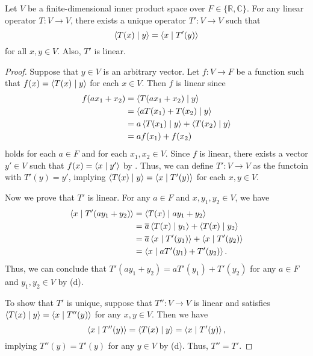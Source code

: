 \begin{theorem}
  Let $V$ be a finite-dimensional inner product space over
  $F \in \{\mathbb{R}, \mathbb{C}\}$.
  For any linear operator $T: V \to V$, there exists a unique operator
  $T': V \to V$ such that
  \begin{equation*}
    \left\langle T(x) \; \middle| \; y \right\rangle = \left\langle x \; \middle| \; T'(y) \right\rangle
  \end{equation*}
  for all $x, y \in V$.
  Also, $T'$ is linear.
\end{theorem}
\begin{proof}
  Suppose that $y \in V$ is an arbitrary vector.
  Let $f: V \to F$ be a function such that $f(x) = \left\langle T(x) \; \middle| \; y \right\rangle$ for each
  $x \in V$.
  Then $f$ is linear since
  \begin{align*}
    f(ax_1 + x_2)
    &= \left\langle T(ax_1 + x_2) \; \middle| \; y \right\rangle \\
    &= \left\langle aT(x_1) + T(x_2) \; \middle| \; y \right\rangle \\
    &= a\left\langle T(x_1) \; \middle| \; y \right\rangle + \left\langle T(x_2) \; \middle| \; y \right\rangle \\
    &= af(x_1) + f(x_2)
  \end{align*}
  holds for each $a \in F$ and for each $x_1, x_2 \in V$.
  Since $f$ is linear, there exists a vector $y' \in V$ such that
  $f(x) = \left\langle x \; \middle| \; y' \right\rangle$ by .
  Thus, we can define $T': V \to V$ as the functoin with $T'(y) = y'$,
  implying $\left\langle T(x) \; \middle| \; y \right\rangle = \left\langle x \; \middle| \; T'(y) \right\rangle$ for each $x, y \in V$.

  Now we prove that $T'$ is linear.
  For any $a \in F$ and $x, y_1, y_2 \in V$, we have
  \begin{align*}
    \left\langle x \; \middle| \; T'(ay_1 + y_2) \right\rangle
    &= \left\langle T(x) \; \middle| \; ay_1 + y_2 \right\rangle \\
    &= \overline{a}\left\langle T(x) \; \middle| \; y_1 \right\rangle + \left\langle T(x) \; \middle| \; y_2 \right\rangle \\
    &= \overline{a}\left\langle x \; \middle| \; T'(y_1) \right\rangle + \left\langle x \; \middle| \; T'(y_2) \right\rangle \\
    &= \left\langle x \; \middle| \; aT'(y_1) + T'(y_2) \right\rangle.
  \end{align*}
  Thus, we can conclude that $T'(ay_1 + y_2) = aT'(y_1) + T'(y_2)$ for any
  $a \in F$ and $y_1, y_2 \in V$ by  (d).

  To show that $T'$ is unique, suppose that $T'': V \to V$ is linear and
  satisfies $\left\langle T(x) \; \middle| \; y \right\rangle = \left\langle x \; \middle| \; T''(y) \right\rangle$ for any $x, y \in V$.
  Then we have
  \begin{equation*}
    \left\langle x \; \middle| \; T''(y) \right\rangle = \left\langle T(x) \; \middle| \; y \right\rangle = \left\langle x \; \middle| \; T'(y) \right\rangle,
  \end{equation*}
  implying $T''(y) = T'(y)$ for any $y \in V$ by 
  (d).
  Thus, $T'' = T'$.
\end{proof}

